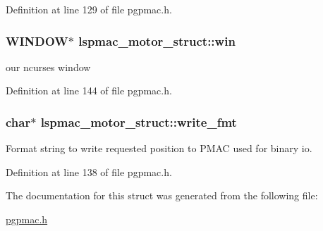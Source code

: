 Definition at line 129 of file pgpmac.\-h.

\hypertarget{structlspmac__motor__struct_a133775154b0e008f3a2fde6f53bc0eff}{
\subsubsection[{win}]{\setlength{\rightskip}{0pt plus 5cm}W\-I\-N\-D\-O\-W$\ast$ lspmac\-\_\-motor\-\_\-struct\-::win}}\label{structlspmac__motor__struct_a133775154b0e008f3a2fde6f53bc0eff}


our ncurses window 



Definition at line 144 of file pgpmac.\-h.

\hypertarget{structlspmac__motor__struct_a70291ddfe7994c0bec7fc2287cb6dd89}{
\subsubsection[{write\-\_\-fmt}]{\setlength{\rightskip}{0pt plus 5cm}char$\ast$ lspmac\-\_\-motor\-\_\-struct\-::write\-\_\-fmt}}\label{structlspmac__motor__struct_a70291ddfe7994c0bec7fc2287cb6dd89}


Format string to write requested position to P\-M\-A\-C used for binary io. 



Definition at line 138 of file pgpmac.\-h.



The documentation for this struct was generated from the following file\-:\begin{DoxyCompactItemize}
\item 
\hyperlink{pgpmac_8h}{pgpmac.\-h}\end{DoxyCompactItemize}
